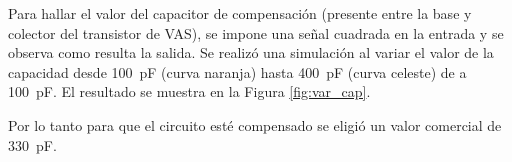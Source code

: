 Para hallar el valor del capacitor de compensación (presente entre la base y colector del transistor de VAS), se impone una señal cuadrada en la entrada y se observa como resulta la salida. Se realizó una simulación al variar el valor de la capacidad desde \SI{100}{\pico\farad} (curva naranja) hasta \SI{400}{\pico\farad} (curva celeste) de a \SI{100}{\pico\farad}. El resultado se muestra en la Figura \ref{fig:var_cap}.



Por lo tanto para que el circuito esté compensado se eligió un valor comercial de \SI{330}{\pico\farad}.
